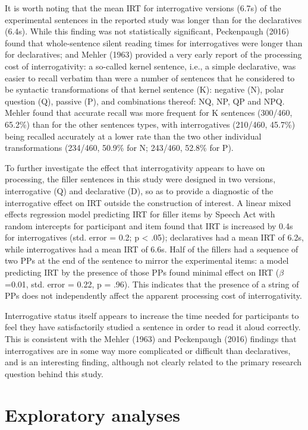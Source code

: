 \documentclass[11pt,oneside]{book}
\begin{document}
It is worth noting that the mean IRT for interrogative versions (6.7s) of the experimental sentences in the reported study was longer than for the declaratives (6.4s). While this finding was not statistically significant, Peckenpaugh (2016) found that whole-sentence silent reading times for interrogatives were longer than for declaratives; and Mehler (1963) provided a very early report of the processing cost of interrogativity: a so-called kernel sentence, i.e., a simple declarative, was easier to recall verbatim than were a number of sentences that he considered to be syntactic transformations of that kernel sentence (K): negative (N), polar question (Q), passive (P), and combinations thereof: NQ, NP, QP and NPQ. Mehler found that accurate recall was more frequent for K sentences (300/460, 65.2\%) than for the other sentences types, with interrogatives (210/460, 45.7\%) being recalled accurately at a lower rate than the two other individual transformations (234/460, 50.9\% for N; 243/460, 52.8\% for P).

To further investigate the effect that interrogativity appears to have on processing, the filler sentences in this study were designed in two versions, interrogative (Q) and declarative (D), so as to provide a diagnostic of the interrogative effect on IRT outside the construction of interest. A linear mixed effects regression model predicting IRT for filler items by Speech Act with random intercepts for participant and item found that IRT is increased by 0.4s for interrogatives (std. error = 0.2; p \textless{} .05); declaratives had a mean IRT of 6.2s, while interrogatives had a mean IRT of 6.6s. Half of the fillers had a sequence of two PPs at the end of the sentence to mirror the experimental items: a model predicting IRT by the presence of those PPs found minimal effect on IRT (\(\beta\)=0.01, std. error = 0.22, p = .96). This indicates that the presence of a string of PPs does not independently affect the apparent processing cost of interrogativity.

Interrogative status itself appears to increase the time needed for participants to feel they have satisfactorily studied a sentence in order to read it aloud correctly. This is consistent with the Mehler (1963) and Peckenpaugh (2016) findings that interrogatives are in some way more complicated or difficult than declaratives, and is an interesting finding, although not clearly related to the primary research question behind this study.

\hypertarget{exploratory-analyses}{%
\section{Exploratory analyses}\label{exploratory-analyses}}
\end{document}
